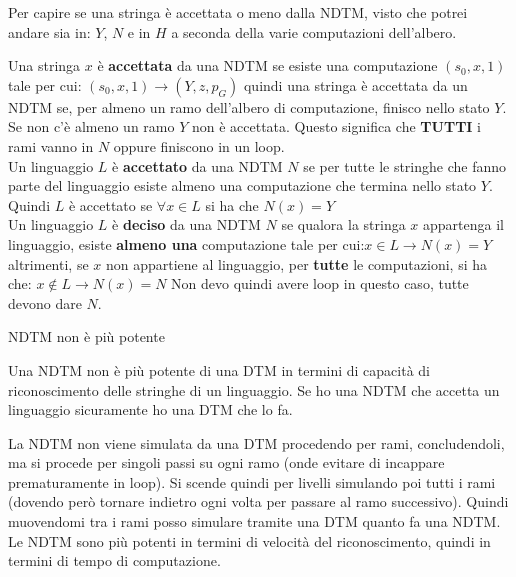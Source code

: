 Per capire se una stringa è accettata o meno dalla NDTM, visto che potrei andare sia in: $Y$, $N$ e in $H$ a seconda della varie computazioni dell'albero.

Una stringa $x$ è \textbf{accettata} da una NDTM se esiste una computazione $(s_0,x,1)$ tale per cui: $(s_0,x,1)\to(Y, z, p_G)$ quindi una stringa è accettata da un NDTM se, per almeno un ramo dell'albero di computazione, finisco nello stato $Y$. Se non c'è almeno un ramo $Y$ non è accettata. Questo significa che \textbf{TUTTI} i rami vanno in $N$ oppure finiscono in un loop.\\

Un linguaggio $L$ è \textbf{accettato} da una NDTM $N$ se per tutte le stringhe che fanno parte del linguaggio esiste almeno una computazione che termina nello stato $Y$. Quindi $L$ è accettato se $\forall x \in L $ si ha che $N(x) = Y$\\

Un linguaggio $L$ è \textbf{deciso} da una NDTM $N$ se qualora la stringa $x$ appartenga il linguaggio, esiste \textbf{almeno una} computazione tale per cui:$x\in L\rightarrow N(x)=Y$  altrimenti, se $x$ non appartiene al linguaggio, per \textbf{tutte} le  computazioni, si ha che: $x\not\in L \rightarrow N(x)=N$
Non devo quindi avere loop in questo caso, tutte devono dare $N$.

\begin{teorema}{NDTM non è più potente}{}
\par
Una NDTM non è più potente di una DTM in termini di capacità di riconoscimento delle stringhe di un linguaggio. Se ho una NDTM che accetta un linguaggio sicuramente ho una DTM che lo fa.
\end{teorema}
La NDTM non viene simulata da una DTM procedendo per rami, concludendoli, ma si procede per singoli passi su ogni ramo (onde evitare di incappare prematuramente in loop). Si scende quindi per livelli simulando poi tutti i rami (dovendo però tornare indietro ogni volta per passare al ramo successivo). Quindi muovendomi tra i rami posso simulare tramite una DTM quanto fa una NDTM.\\
Le NDTM sono più potenti in termini di velocità del riconoscimento, quindi in termini di tempo di computazione.\\

